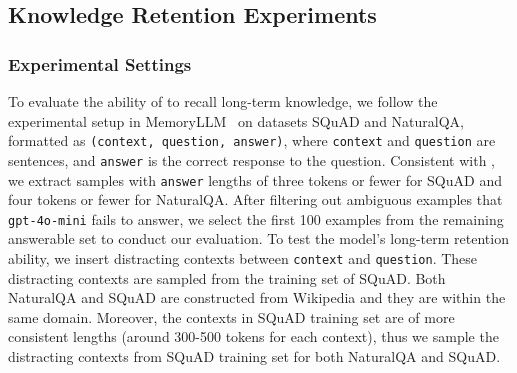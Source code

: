 \begin{table}[ht]
    \centering
    \caption{Experimental Results on LongBench.}
    \label{tab:longbench}
    \vspace{-10pt}
\end{table}

\subsection{Knowledge Retention Experiments}
\label{sub:knowledge_retention_experiments}
\subsubsection{Experimental Settings}
To evaluate the ability of \ours to recall long-term knowledge, we follow the experimental setup in MemoryLLM~\citep{memoryllm} on datasets SQuAD and NaturalQA, formatted as \texttt{(context, question, answer)}, where \texttt{context} and \texttt{question} are sentences, and \texttt{answer} is the correct response to the question. Consistent with \citet{memoryllm}, we extract samples with \texttt{answer} lengths of three tokens or fewer for SQuAD and four tokens or fewer for NaturalQA. After filtering out ambiguous examples that \texttt{gpt-4o-mini} fails to answer, we select the first 100 examples from the remaining answerable set to conduct our evaluation. To test the model's long-term retention ability, we insert distracting contexts between \texttt{context} and \texttt{question}. These distracting contexts are sampled from the training set of SQuAD. Both NaturalQA and SQuAD are constructed from Wikipedia and they are within the same domain. Moreover, the contexts in SQuAD training set are of more consistent lengths (around 300-500 tokens for each context), thus we sample the distracting contexts from SQuAD training set for both NaturalQA and SQuAD. 

